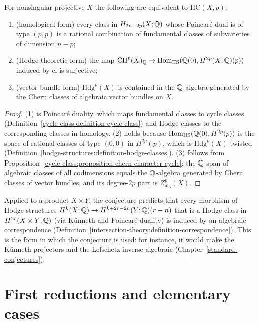 \begin{proposition}\label{hodge-conjecture:proposition-equivalent-forms}
For nonsingular projective $X$ the following are equivalent to $\mathrm{HC}(X, p)$:
\begin{enumerate}
\item (homological form) every class in $H_{2n-2p}(X; \mathbb{Q})$ whose Poincar\'e dual is of type $(p,p)$ is a rational combination of fundamental classes of subvarieties of dimension $n - p$;
\item (Hodge-theoretic form) the map $\operatorname{CH}^p(X)_{\mathbb{Q}} \to \operatorname{Hom}_{\mathrm{HS}}(\mathbb{Q}(0), H^{2p}(X; \mathbb{Q})(p))$ induced by $\mathrm{cl}$ is surjective;
\item (vector bundle form) $\mathrm{Hdg}^p(X)$ is contained in the $\mathbb{Q}$-algebra generated by the Chern classes of algebraic vector bundles on $X$.
\end{enumerate}
\end{proposition}

\begin{proof}
(1) is Poincar\'e duality, which maps fundamental classes to cycle classes (Definition~\ref{cycle-class:definition-cycle-class}) and Hodge classes to the corresponding classes in
homology. (2) holds because $\operatorname{Hom}_{\mathrm{HS}}(\mathbb{Q}(0), H^{2p}(p))$ is the space of rational classes of type $(0,0)$ in $H^{2p}(p)$, which is $\mathrm{Hdg}^p(X)$ twisted
(Definition~\ref{hodge-structures:definition-hodge-classes}). (3) follows from Proposition~\ref{cycle-class:proposition-chern-character-cycle}: the $\mathbb{Q}$-span of algebraic classes of all
codimensions equals the $\mathbb{Q}$-algebra generated by Chern classes of vector bundles, and its degree-$2p$ part is $Z^p_{\mathrm{alg}}(X)$.
\end{proof}

\begin{remark}\label{hodge-conjecture:remark-correspondence-form}
Applied to a product $X \times Y$, the conjecture predicts that every morphism of Hodge structures $H^k(X; \mathbb{Q}) \to H^{k+2r-2n}(Y; \mathbb{Q})(r - n)$ that is a Hodge class in
$H^{2r}(X \times Y; \mathbb{Q})$ (via K\"unneth and Poincar\'e duality) is induced by an algebraic correspondence (Definition~\ref{intersection-theory:definition-correspondence}). This is the form in which
the conjecture is used: for instance, it would make the K\"unneth projectors and the Lefschetz inverse algebraic (Chapter~\ref{standard-conjectures}).
\end{remark}

\section{First reductions and elementary cases}\label{hodge-conjecture:section-reductions}

